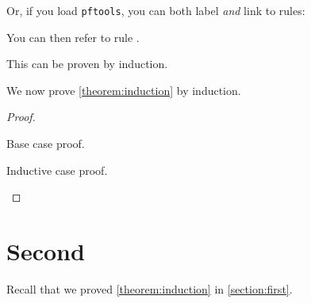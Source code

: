 \documentclass{gak-article}
\begin{document}
  Or, if you load \texttt{pftools}, you can both label \emph{and} link to rules:
  You can then refer to rule .
  
  \begin{theorem}
      \label{theorem:induction}
    This can be proven by induction.
  \end{theorem}
  
  We now prove \cref{theorem:induction} by induction.
  
  \begin{proof} \hfill
    \begin{indproof}
       Base case proof.

       Inductive case proof.
    \end{indproof}
  \end{proof}

  
\section{Second}

Recall that we proved \cref{theorem:induction} in \cref{section:first}.

\lipsum[4]

\printbibliography
\end{document}
